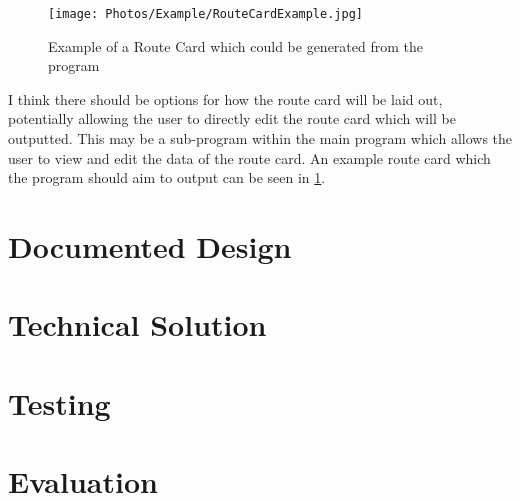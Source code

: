 \documentclass{article}
\begin{document}
        \begin{figure}[h]
            \centering
            \texttt{[image: Photos/Example/RouteCardExample.jpg]}
            \caption{Example of a Route Card which could be generated from the program}
            \label{fig:example_route_card}
         \end{figure}
         
         I think there should be options for how the route card will be laid out, potentially allowing the user to directly edit the route card which will be outputted. This may be a sub-program within the main program which allows the user to view and edit the data of the route card. An example route card which the program should aim to output can be seen in \cref{fig:example_route_card}.
         
\newpage

\section{Documented Design}

    

\newpage
    
\section{Technical Solution}

    

\newpage

\section{Testing}

    

\newpage

\section{Evaluation}

    
    
\end{document}
